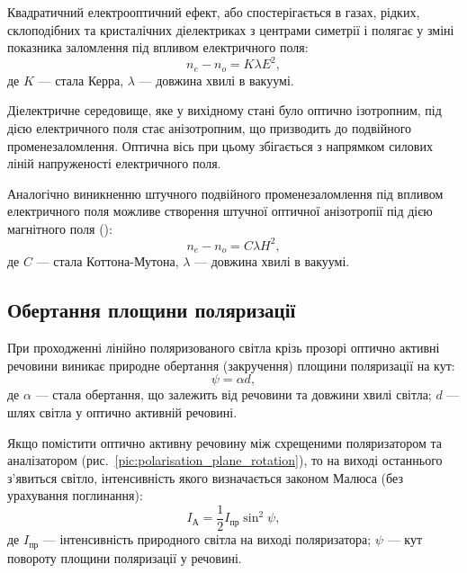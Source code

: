 \medskip

Квадратичний електрооптичний ефект, або  спостерігається в газах, рідких, склоподібних та кристалічних діелектриках з центрами симетрії і полягає у зміні
показника заломлення під впливом електричного поля:
\begin{equation}\label{eq:kerr_effect}
    n_e - n_o = K\lambda E^2,
\end{equation}
де $K$ --- стала Керра, $ \lambda $ --- довжина хвилі в вакуумі.

Діелектричне середовище, яке у вихідному стані було оптично ізотропним, під дією електричного поля стає анізотропним, що призводить до подвійного променезаломлення. Оптична вісь при цьому збігається з напрямком силових ліній напруженості електричного поля.

\medskip

Аналогічно виникненню штучного подвійного променезаломлення
під впливом електричного поля можливе створення
штучної оптичної анізотропії під дією магнітного поля ():
\begin{equation}\label{eq:cotton-mutton_effect}
    n_e - n_o = C\lambda H^2,
\end{equation}
де $C$ --- стала Коттона-Мутона, $ \lambda $ --- довжина хвилі в вакуумі.





\subsection*{Обертання площини поляризації}


При проходженні лінійно поляризованого світла крізь прозорі
оптично активні речовини виникає природне обертання (закручення)
площини поляризації на кут:
\begin{equation}\label{eq:rotation_angle}
    \psi = \alpha d,
\end{equation}
де $ \alpha $ --- стала обертання, що залежить від речовини та довжини хвилі світла;
$ d $ --- шлях світла у оптично активній речовині.

Якщо помістити оптично активну речовину між схрещеними
поляризатором та аналізатором (рис.~\ref{pic:polarisation_plane_rotation}), то на виході останнього з’явиться світло, інтенсивність якого визначається законом Малюса (без урахування поглинання):
\begin{equation}\label{}
    I_\text{А} = \frac12 I_\text{пр} \sin^2\psi,
\end{equation}
де $ I_\text{пр} $ --- інтенсивність природного світла на виході поляризатора; $ \psi $ --- кут повороту площини поляризації у речовині.

